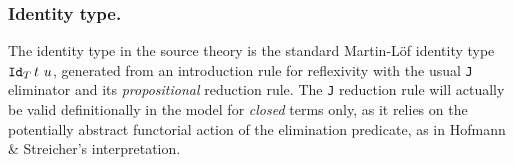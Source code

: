 \subsubsection{Identity type.} 
%
The identity type in the source theory is the standard
Martin-Löf identity type $\texttt{Id}_{T}\,t\ u$, generated from an
introduction rule for reflexivity with the usual \texttt{J} eliminator
and its \emph{propositional} reduction rule. The \texttt{J} reduction 
rule will actually be valid definitionally in the model for
\emph{closed} terms only, as it relies on the potentially abstract
functorial action of the elimination predicate, as in Hofmann \&
Streicher's interpretation.


\def\hFin#1{\mathtt{\hat Fin}\ #1}
\def\Fin#1{\texttt{Fin}\ #1}
\def\fin#1#2{\underline{#1}_{#2}}



